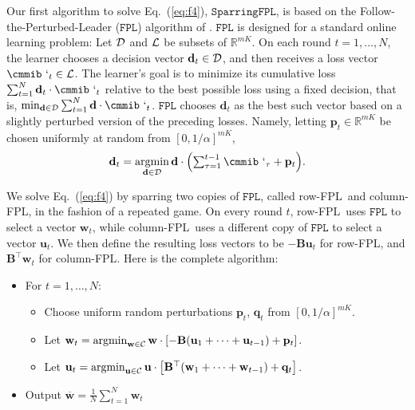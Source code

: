 Our first algorithm to solve Eq.~(\ref{eq:f4}), \ensuremath{\mathtt{SparringFPL}}, is based on the Follow-the-Perturbed-Leader (\ensuremath{\mathtt{FPL}})
algorithm of \citet{kalai03:fpl}. \ensuremath{\mathtt{FPL}} is designed for a standard online learning problem: Let ${\cal D}$ and ${\cal L}$ be subsets of ${\mathbb{R}}^{m K}$. On each round $t=1,\ldots,{N}$,
the learner chooses a decision vector $\mathbf{d}_t\in{\cal D}$, and then receives a loss vector ${\mbox{\cmmib \symbol{'140}}}_t\in{\cal L}$. The learner's goal is to minimize its cumulative loss
$\sum_{t=1}^{N} \mathbf{d}_t\cdot{\mbox{\cmmib \symbol{'140}}}_t$ relative to the best possible loss using a fixed decision, that is,
$\min_{\mathbf{d}\in{\cal D}} \sum_{t=1}^{N} \mathbf{d}\cdot{\mbox{\cmmib \symbol{'140}}}_t$.
\ensuremath{\mathtt{FPL}} chooses $\mathbf{d}_t$ as the best such vector based on a slightly perturbed version of the preceding losses. Namely, letting $\mathbf{p}_t\in{\mathbb{R}}^{m K}$ be chosen uniformly at random from $[0,1/{\alpha}]^{m K}$,
\[ \mathbf{d}_t = \operatornamewithlimits{argmin}_{\mathbf{d}\in{\cal D}} \mathbf{d}\cdot
\textstyle            {\left({\sum_{\tau=1}^{t-1} {\mbox{\cmmib \symbol{'140}}}_{\tau} + \mathbf{p}_t}\right)}.
\]

We solve Eq.~(\ref{eq:f4}) by sparring two copies of
\ensuremath{\mathtt{FPL}}, called {row-FPL}\ and {column-FPL}, in the fashion of a repeated game. On every round $t$, {row-FPL}\ uses \ensuremath{\mathtt{FPL}} to select a vector $\mathbf{w}_t$,
while {column-FPL}\ uses a different copy of \ensuremath{\mathtt{FPL}} to select a vector
$\mathbf{u}_t$.
We then define the resulting loss vectors to be $-\mathbf{B} \mathbf{u}_t$ for {row-FPL}, and ${\mathbf{B}^{\top}}\mathbf{w}_t$ for {column-FPL}. Here is the complete algorithm:

\begin{itemize}  \itemsep0pt \parskip0pt  \item For $t=1,\ldots,{N}$:
\begin{itemize}  \itemsep0pt \parskip0pt  \item Choose uniform random perturbations $\mathbf{p}_t$, $\mathbf{q}_t$ from
$[0,1/{\alpha}]^{m K}$.
\item
Let $\mathbf{w}_t = \operatornamewithlimits{argmin}_{\mathbf{w}\in{\cal C}}
           {\mathbf{w}} \cdot {\left[{
                   -\mathbf{B} (\mathbf{u}_1 + \cdots + \mathbf{u}_{t-1}) + \mathbf{p}_t
                                }\right]}$.

\item Let $\mathbf{u}_t = \operatornamewithlimits{argmin}_{\mathbf{u}\in{\cal C}}
         {\mathbf{u}} \cdot {\left[{ {\mathbf{B}^{\top}}(\mathbf{w}_1 + \cdots + \mathbf{w}_{t-1}) +
           \mathbf{q}_t }\right]}$.
\end{itemize}
\item Output
${\overline{\mathbf{w}}} = \frac{1}N
          \sum_{t=1}^{N} \mathbf{w}_t$
\end{itemize}

